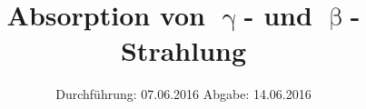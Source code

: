 
\subject{704}
\title{Absorption von \texorpdfstring{$\upgamma$}{γ}- und \texorpdfstring{$\upbeta$}{β}-Strahlung}
\date{
  Durchführung: 07.06.2016
  \hspace{3em}
  Abgabe: 14.06.2016 
}



\maketitle
\newpage
\mbox{}
\newpage
\thispagestyle{empty}
\tableofcontents
\newpage






\nocite{numpy}
\nocite{matplotlib}
\nocite{uncertainties}
\printbibliography


